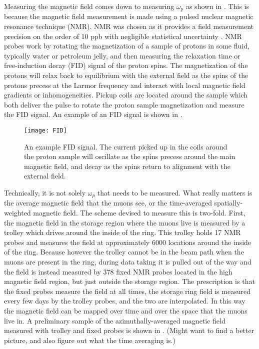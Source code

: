 Measuring the magnetic field comes down to measuring $\omega_{p}$ as shown in . This is because the magnetic field measurement is made using a pulsed nuclear magnetic resonance technique (NMR). NMR was chosen as it provides a field measurement precision on the order of 10 ppb with negligible statistical uncertainty \cite{TDR}. NMR probes work by rotating the magnetization of a sample of protons in some fluid, typically water or petroleum jelly, and then measuring the relaxation time or free-induction decay (FID) signal of the proton spins. The magnetization of the protons will relax back to equilibrium with the external field as the spins of the protons precess at the Larmor frequency and interact with local magnetic field gradients or inhomogeneities. Pickup coils are located around the sample which both deliver the pulse to rotate the proton sample magnetization and measure the FID signal. An example of an FID signal is shown in .

\begin{figure}[]
    \centering
    \texttt{[image: FID]}
    \caption[FID signal]{An example FID signal. The current picked up in the coils around the proton sample will oscillate as the spins precess around the main magnetic field, and decay as the spins return to alignment with the external field.}
    \label{fig:FID}
\end{figure}

Technically, it is not solely $\omega_{p}$ that needs to be measured. What really matters is the average magnetic field that the muons see, or the time-averaged spatially-weighted magnetic field. The scheme devised to measure this is two-fold. First, the magnetic field in the storage region where the muons live is measured by a trolley which drives around the inside of the ring. This trolley holds 17 NMR probes and measures the field at approximately 6000 locations around the inside of the ring. Because however the trolley cannot be in the beam path when the muons are present in the ring, during data taking it is pulled out of the way and the field is instead measured by 378 fixed NMR probes located in the high magnetic field region, but just outside the storage region. The prescription is that the fixed probes measure the field at all times, the storage ring field is measured every few days by the trolley probes, and the two are interpolated. In this way the magnetic field can be mapped over time and over the space that the muons live in. A preliminary sample of the azimuthally-averaged magnetic field measured with trolley and fixed probes is shown in . (Might want to find a better picture, and also figure out what the time averaging is.)

